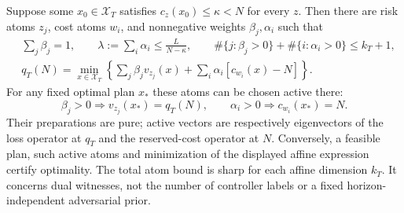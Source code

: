 \begin{theorem}\label{thm:sparse-witness}
Suppose some $x_0\in\mathcal X_T$ satisfies $c_z(x_0)\le\kappa<N$ for every $z$. Then there are risk atoms $z_j$, cost atoms $w_i$, and nonnegative weights $\beta_j,\alpha_i$ such that
\begin{align}
 &\sum_j\beta_j=1,\qquad
 \lambda:=\sum_i\alpha_i\le\frac{L}{N-\kappa},\qquad
 \#\{j:\beta_j>0\}+\#\{i:\alpha_i>0\}\le k_T+1,\label{eq:sparse-size}\\
 &q_T(N)=\min_{x\in\mathcal X_T}
 \left\{\sum_j\beta_jv_{z_j}(x)+
                    \sum_i\alpha_i[c_{w_i}(x)-N]\right\}.\label{eq:sparse-dual}
\end{align}
For any fixed optimal plan $x_*$ these atoms can be chosen active there:
\[
 \beta_j>0\Rightarrow v_{z_j}(x_*)=q_T(N),\qquad
 \alpha_i>0\Rightarrow c_{w_i}(x_*)=N.
\]
Their preparations are pure; active vectors are respectively eigenvectors of the loss operator at $q_T$ and the reserved-cost operator at $N$. Conversely, a feasible plan, such active atoms and minimization of the displayed affine expression certify optimality. The total atom bound is sharp for each affine dimension $k_T$. It concerns dual witnesses, not the number of controller labels or a fixed horizon-independent adversarial prior.
\end{theorem}
